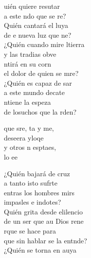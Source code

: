 \documentclass[12pt]{article}
\begin{document}
\begin{multicols*}{2}
\begin{cancion}%
	uién quiere resutar \\
	a este ndo que se re?\\
	Quién cantará el luya\\
	de e nueva luz que ne?\\
	¿Quién cuando mire ltierra \\
	y las tradias obve\\
	ntirá en su corn  \\
	el dolor de quien se mre?\\
	¿Quién es capaz de sar \\
	a este mundo decate\\
	ntiene la espeza \\
	de losuchos que la rden?\\
	\begin{chorus}%
	que sre, ta y me, \\
	deseera yloqe\\
	y otros n esptaes, \\
	lo ee\\
	\end{chorus}%
	¿Quién bajará de  cruz \\
	a tanto isto sufrte\\
	entras los hombres mirs \\
	impasles e indotes?\\
	Quién grita desde elilencio \\
	de un ser que au Dios rene\\
	rque se hace para \\
	que sin hablar se la entnde?\\
	¿Quién se torna en auya\\

\end{cancion}
\end{multicols*}
\end{document}
